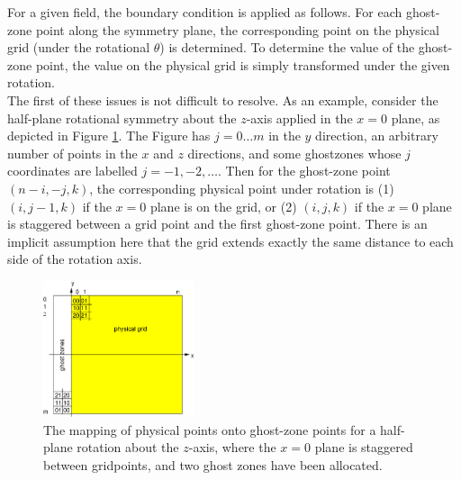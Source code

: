 \documentclass{article}
\newif\ifpdf
\begin{document}
For a given field, the boundary condition is applied as follows. For
each ghost-zone point along the symmetry plane, the corresponding
point on the physical grid (under the rotational $\theta$) is
determined. To determine the value of the ghost-zone point, the
value on the physical grid is simply transformed under the given
rotation.\\

The first of these issues is not difficult to resolve. As an example,
consider the half-plane rotational symmetry about the $z$-axis applied
in the $x=0$ plane, as depicted in Figure \ref{fig:rs_grid}. The
Figure has
$j=0\ldots m$ in the $y$ direction, an arbitrary number of points in the
$x$ and $z$ directions, and some ghostzones whose $j$ coordinates are
labelled $j=-1,-2,\ldots$. Then for the ghost-zone point $(n-i, -j,
k)$, the corresponding physical point under rotation is (1) $(i,j-1,k)$
if the $x=0$ plane is on the grid, or (2) $(i,j,k)$ if the $x=0$ plane
is staggered between a grid point and the first ghost-zone
point. There is an implicit assumption here that the grid extends
exactly the same distance to each side of the rotation axis. \\

\begin{figure}
\centering
\ifpdf
\else
\includegraphics[height=40mm]{fig/rotate_grid.eps}
\fi
\caption{The mapping of physical points onto ghost-zone points for a
  half-plane rotation about the $z$-axis, where the $x=0$ plane is
  staggered between gridpoints, and two ghost zones have been
  allocated.}
\label{fig:rs_grid}
\end{figure}
\end{document}
